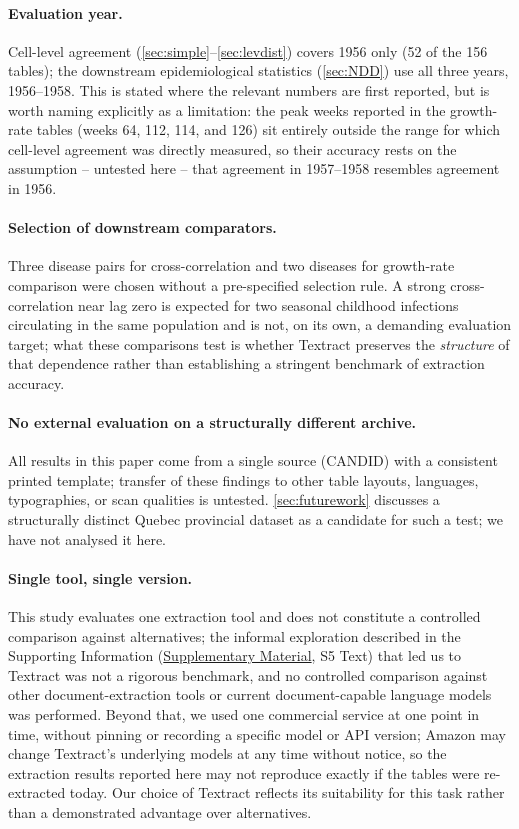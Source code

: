 \documentclass[12pt]{article}
\begin{document}
\paragraph{Evaluation year.} Cell-level agreement (\cref{sec:simple}--\cref{sec:levdist}) covers 1956 only (52 of the 156 tables); the downstream epidemiological statistics (\cref{sec:NDD}) use all three years, 1956--1958. This is stated where the relevant numbers are first reported, but is worth naming explicitly as a limitation: the peak weeks reported in the growth-rate tables (weeks 64, 112, 114, and 126) sit entirely outside the range for which cell-level agreement was directly measured, so their accuracy rests on the assumption -- untested here -- that agreement in 1957--1958 resembles agreement in 1956.

\paragraph{Selection of downstream comparators.} Three disease pairs for cross-correlation and two diseases for growth-rate comparison were chosen without a pre-specified selection rule. A strong cross-correlation near lag zero is expected for two seasonal childhood infections circulating in the same population and is not, on its own, a demanding evaluation target; what these comparisons test is whether Textract preserves the \emph{structure} of that dependence rather than establishing a stringent benchmark of extraction accuracy.

\paragraph{No external evaluation on a structurally different archive.} All results in this paper come from a single source (CANDID) with a consistent printed template; transfer of these findings to other table layouts, languages, typographies, or scan qualities is untested. \cref{sec:futurework} discusses a structurally distinct Quebec provincial dataset as a candidate for such a test; we have not analysed it here.

\paragraph{Single tool, single version.} This study evaluates one extraction tool and does not constitute a controlled comparison against alternatives; the informal exploration described in the Supporting Information (\hyperref[sec:supp]{Supplementary Material}, S5 Text) that led us to Textract was not a rigorous benchmark, and no controlled comparison against other document-extraction tools or current document-capable language models was performed. Beyond that, we used one commercial service at one point in time, without pinning or recording a specific model or API version; Amazon may change Textract's underlying models at any time without notice, so the extraction results reported here may not reproduce exactly if the tables were re-extracted today. Our choice of Textract reflects its suitability for this task rather than a demonstrated advantage over alternatives.
\end{document}
